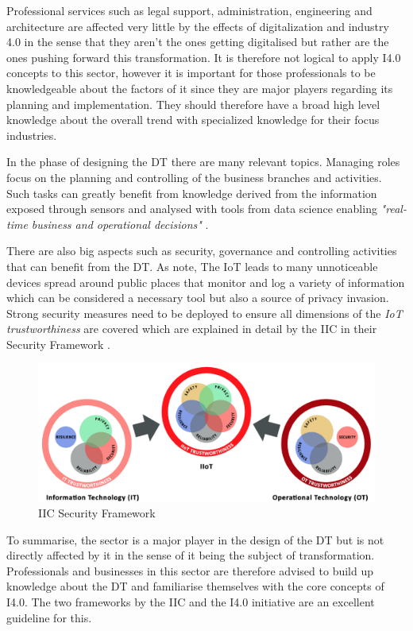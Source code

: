 Professional services such as legal support, administration, engineering and architecture are affected very little by the effects of digitalization and industry 4.0 in the sense that they aren't the ones getting digitalised but rather are the ones pushing forward this transformation. It is therefore not logical to apply \ac{I4.0} concepts to this sector, however it is important for those professionals to be knowledgeable about the factors of it since they are major players regarding its planning and implementation. They should therefore have a broad high level knowledge about the overall trend with specialized knowledge for their focus industries. 

In the phase of designing the \ac{DT} there are many relevant topics. Managing roles focus on the planning and controlling of the business branches and activities. Such tasks can greatly benefit from knowledge derived from the information exposed through sensors and analysed with tools from data science enabling \emph{"real-time business and operational decisions"} \cite[p.84]{iicarchitecture:2016}. 

There are also big aspects such as security, governance and controlling activities that can benefit from the \ac{DT}. As \citeauthor{Tragos2016trusted} note, The \ac{IoT} leads to many unnoticeable devices spread around public places that monitor and log a variety of information which can be considered a necessary tool but also a source of privacy invasion. Strong security measures need to be deployed to ensure all dimensions of the \emph{\ac{IoT} trustworthiness} are covered which are explained in detail by the \ac{IIC} in their Security Framework \cite{iicsecurity:2016}. 

\begin{figure}[H]
\centering
\includegraphics[width=1\columnwidth]{images/iic-iiot-trustworthiness}
\caption{\ac{IIC} Security Framework}
\end{figure}

To summarise, the sector is a major player in the design of the \ac{DT} but is not directly affected by it in the sense of it being the subject of transformation. Professionals and businesses in this sector are therefore advised to build up knowledge about the \ac{DT} and familiarise themselves with the core concepts of \ac{I4.0}. The two frameworks by the \ac{IIC} and the \ac{I4.0} initiative are an excellent guideline for this. 

